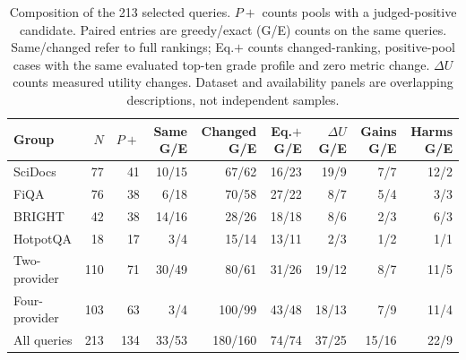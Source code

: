 \begin{table}[t]
\caption{Composition of the 213 selected queries. $P+$ counts pools with a judged-positive candidate. Paired entries are greedy/exact (G/E) counts on the same queries. Same/changed refer to full rankings; Eq.$+$ counts changed-ranking, positive-pool cases with the same evaluated top-ten grade profile and zero metric change. $\Delta U$ counts measured utility changes. Dataset and availability panels are overlapping descriptions, not independent samples.}
\label{tab:selected-composition}\papertable
\begin{tabularx}{\linewidth}{@{}Yrrrrrrrr@{}}\toprule
Group & $N$ & $P+$ & Same G/E & Changed G/E & Eq.$+$ G/E & $\Delta U$ G/E & Gains G/E & Harms G/E\\\midrule
SciDocs & 77 & 41 & 10/15 & 67/62 & 16/23 & 19/9 & 7/7 & 12/2\\
FiQA & 76 & 38 & 6/18 & 70/58 & 27/22 & 8/7 & 5/4 & 3/3\\
BRIGHT & 42 & 38 & 14/16 & 28/26 & 18/18 & 8/6 & 2/3 & 6/3\\
HotpotQA & 18 & 17 & 3/4 & 15/14 & 13/11 & 2/3 & 1/2 & 1/1\\
\midrule
Two-provider & 110 & 71 & 30/49 & 80/61 & 31/26 & 19/12 & 8/7 & 11/5\\
Four-provider & 103 & 63 & 3/4 & 100/99 & 43/48 & 18/13 & 7/9 & 11/4\\
\midrule
All queries & 213 & 134 & 33/53 & 180/160 & 74/74 & 37/25 & 15/16 & 22/9\\
\bottomrule\end{tabularx}
\end{table}
